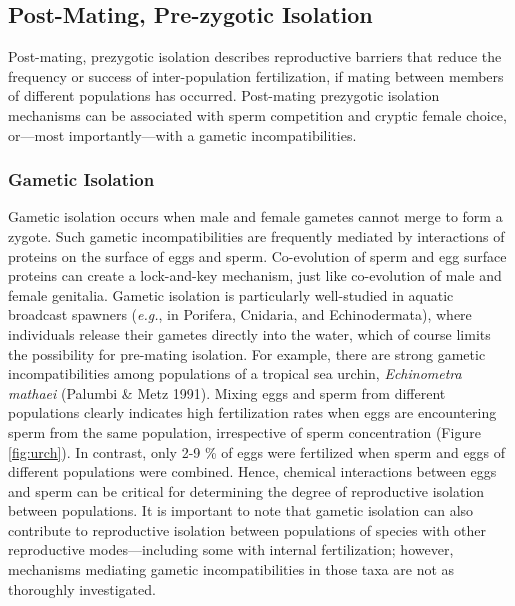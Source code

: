 \documentclass[
]{book}
\begin{document}
\hypertarget{post-mating-pre-zygotic-isolation}{%
\subsection{Post-Mating, Pre-zygotic Isolation}\label{post-mating-pre-zygotic-isolation}}

Post-mating, prezygotic isolation describes reproductive barriers that reduce the frequency or success of inter-population fertilization, if mating between members of different populations has occurred. Post-mating prezygotic isolation mechanisms can be associated with sperm competition and cryptic female choice, or---most importantly---with a gametic incompatibilities.

\hypertarget{gametic-isolation}{%
\subsubsection*{Gametic Isolation}\label{gametic-isolation}}

Gametic isolation occurs when male and female gametes cannot merge to form a zygote. Such gametic incompatibilities are frequently mediated by interactions of proteins on the surface of eggs and sperm. Co-evolution of sperm and egg surface proteins can create a lock-and-key mechanism, just like co-evolution of male and female genitalia. Gametic isolation is particularly well-studied in aquatic broadcast spawners (\emph{e.g.}, in Porifera, Cnidaria, and Echinodermata), where individuals release their gametes directly into the water, which of course limits the possibility for pre-mating isolation. For example, there are strong gametic incompatibilities among populations of a tropical sea urchin, \emph{Echinometra mathaei} (Palumbi \& Metz 1991). Mixing eggs and sperm from different populations clearly indicates high fertilization rates when eggs are encountering sperm from the same population, irrespective of sperm concentration (Figure \ref{fig:urch}). In contrast, only 2-9 \% of eggs were fertilized when sperm and eggs of different populations were combined. Hence, chemical interactions between eggs and sperm can be critical for determining the degree of reproductive isolation between populations. It is important to note that gametic isolation can also contribute to reproductive isolation between populations of species with other reproductive modes---including some with internal fertilization; however, mechanisms mediating gametic incompatibilities in those taxa are not as thoroughly investigated.
\end{document}

